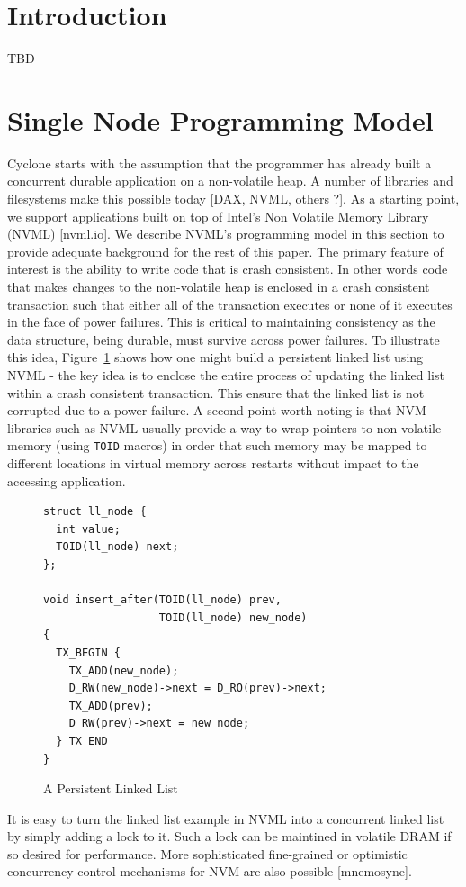 \documentclass[letterpaper,twocolumn,10pt]{article}
\begin{document}
\section{Introduction}
TBD
\section{Single Node Programming Model}
Cyclone starts with the assumption that the programmer has already built a
concurrent durable application on a non-volatile heap. A number of libraries and
filesystems make this possible today [DAX, NVML, others ?]. As a starting point,
we support applications built on top of Intel's Non Volatile Memory Library
(NVML) [nvml.io]. We describe NVML's programming model in this section to
provide adequate background for the rest of this paper. The primary feature of
interest is the ability to write code that is crash consistent. In other words
code that makes changes to the non-volatile heap is enclosed in a crash
consistent transaction such that either all of the transaction executes or none
of it executes in the face of power failures. This is critical to maintaining
consistency as the data structure, being durable, must survive across power
failures. To illustrate this idea, Figure~\ref{fig:example} shows how one might
build a persistent linked list using NVML - the key idea is to enclose the
entire process of updating the linked list within a crash consistent
transaction. This ensure that the linked list is not corrupted due to a power
failure. A second point worth noting is that NVM libraries such as NVML usually
provide a way to wrap pointers to non-volatile memory (using {\tt TOID} macros)
in order that such memory may be mapped to different locations in virtual memory
across restarts without impact to the accessing application.

\begin{figure}
  { \scriptsize
\begin{verbatim}
struct ll_node {
  int value;
  TOID(ll_node) next;
};

void insert_after(TOID(ll_node) prev, 
                  TOID(ll_node) new_node)
{
  TX_BEGIN {
    TX_ADD(new_node);
    D_RW(new_node)->next = D_RO(prev)->next;
    TX_ADD(prev);
    D_RW(prev)->next = new_node;
  } TX_END
}

\end{verbatim}
  }
\caption{A Persistent Linked List}
\label{fig:example}
\end{figure}

It is easy to turn the linked list example in NVML into a concurrent linked list
by simply adding a lock to it. Such a lock can be maintined in volatile DRAM if
so desired for performance. More sophisticated fine-grained or optimistic
concurrency control mechanisms for NVM are also possible [mnemosyne].
\end{document}
